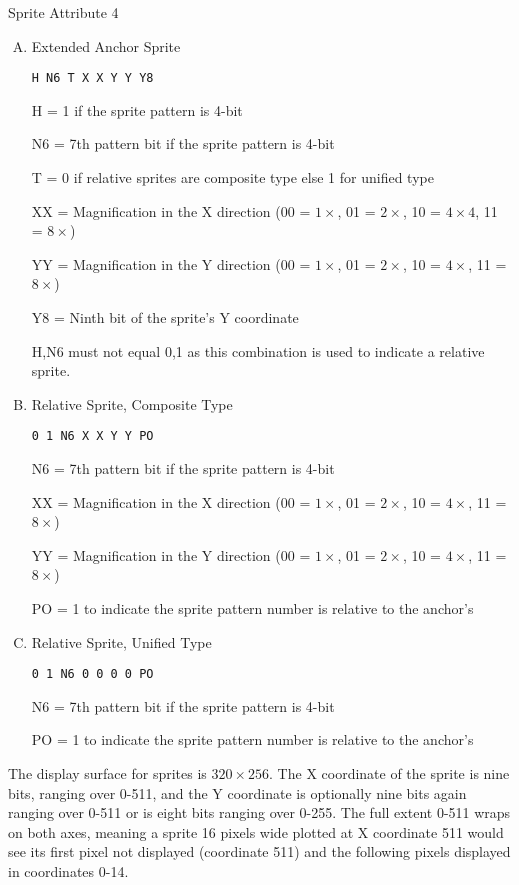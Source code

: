 Sprite Attribute 4
\begin{enumerate}[A.]
\item Extended Anchor Sprite
\begin{verbatim}
H N6 T X X Y Y Y8
\end{verbatim}
H = 1 if the sprite pattern is 4-bit

N6 = 7th pattern bit if the sprite pattern is 4-bit

T = 0 if relative sprites are composite type else 1 for unified type

XX = Magnification in the X direction (00 = $1\times$, 01 = $2\times$,
10 = $4\times4$, 11 = $8\times$)

YY = Magnification in the Y direction (00 = $1\times$, 01 = $2\times$,
10 = $4\times$, 11 = $8\times$)

Y8 = Ninth bit of the sprite’s Y coordinate

{H,N6} must not equal {0,1} as this combination is used to indicate a
relative sprite.

\item Relative Sprite, Composite Type
\begin{verbatim}
0 1 N6 X X Y Y PO
\end{verbatim}
N6 = 7th pattern bit if the sprite pattern is 4-bit

XX = Magnification in the X direction (00 = $1\times$, 01 = $2\times$,
10 = $4\times$, 11 = $8\times$)

YY = Magnification in the Y direction (00 = $1\times$, 01 = $2\times$,
10 = $4\times$, 11 = $8\times$)

PO = 1 to indicate the sprite pattern number is relative to the
anchor’s

\item Relative Sprite, Unified Type
\begin{verbatim}
0 1 N6 0 0 0 0 PO
\end{verbatim}
N6 = 7th pattern bit if the sprite pattern is 4-bit

PO = 1 to indicate the sprite pattern number is relative to the
anchor’s
\end{enumerate}
The display surface for sprites is $320\times256$. The X coordinate of
the sprite is nine bits, ranging over 0-511, and the Y coordinate is
optionally nine bits again ranging over 0-511 or is eight bits ranging
over 0-255. The full extent 0-511 wraps on both axes, meaning a sprite
16 pixels wide plotted at X coordinate 511 would see its first pixel
not displayed (coordinate 511) and the following pixels displayed in
coordinates 0-14.

